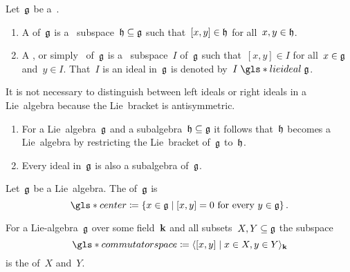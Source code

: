 \begin{definition}
  Let~$\mathfrak{g}$ be a~{\liealgebra{$\kf$}}.
  \begin{enumerate}
    \item
      A  of~$\mathfrak{g}$ is a~{\linear{$\kf$}} subspace~$\mathfrak{h} \subseteq \mathfrak{g}$ such that~$[x,y] \in \mathfrak{h}$ for all~$x, y \in \mathfrak{h}$.
    \item
      A , or simply~ of~$\mathfrak{g}$ is a~{\linear{$\kf$}} subspace~$I$ of~$\mathfrak{g}$ such that~$[x,y] \in I$ for all~$x \in \mathfrak{g}$ and~$y \in I$.
      That~$I$ is an ideal in~$\mathfrak{g}$ is denoted by~$I \mathrel{\gls*{lie ideal}} \glie$.
  \end{enumerate}
\end{definition}


\begin{remark}
  It is not necessary to distinguish between left ideals or right ideals in a Lie~algebra because the Lie~bracket is antisymmetric.
\end{remark}


\begin{remark}
  \leavevmode
  \begin{enumerate}
    \item
      For a Lie~algebra~$\mathfrak{g}$ and a subalgebra~$\mathfrak{h} \subseteq \mathfrak{g}$ it follows that~$\mathfrak{h}$ becomes a Lie~algebra by restricting the Lie~bracket of~$\mathfrak{g}$ to~$\mathfrak{h}$.
    \item
      Every ideal in~$\mathfrak{g}$ is also a subalgebra of~$\mathfrak{g}$.
  \end{enumerate}
\end{remark}


\begin{definition}
  Let~$\mathfrak{g}$ be a Lie~algebra.
  The  of~$\mathfrak{g}$ is
  \[
    \gls*{center}
    \defined
    \{
      x \in \glie
    \suchthat
      \text{$[x,y] = 0$ for every~$y \in \glie$}
    \}  \,.
  \]
\end{definition}


\begin{definition}
  For a Lie-algebra~$\mathfrak{g}$ over some field~$\kf$ and all subsets~$X, Y \subseteq \mathfrak{g}$ the subspace
  \[
    \gls*{commutator space}
    \defined
    \gen{
      [x,y]
    \suchthat
      x \in X,
      y \in Y
    }_{\kf}
  \]
  is the  of~$X$ and~$Y$.
\end{definition}


